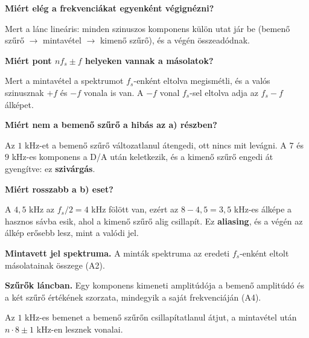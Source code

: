 \begin{elmelet}
\textbf{Miért elég a frekvenciákat egyenként végignézni?}\par Mert a lánc lineáris: minden szinuszos komponens külön utat jár be (bemenő szűrő $\to$ mintavétel $\to$ kimenő szűrő), és a végén összeadódnak.

\textbf{Miért pont $n f_s\pm f$ helyeken vannak a másolatok?}\par Mert a mintavétel a spektrumot $f_s$-enként eltolva megismétli, és a valós szinusznak $+f$ és $-f$ vonala is van. A $-f$ vonal $f_s$-sel eltolva adja az $f_s-f$ álképet.

\textbf{Miért nem a bemenő szűrő a hibás az a) részben?}\par Az $1$ kHz-et a bemenő szűrő változatlanul átengedi, ott nincs mit levágni. A $7$ és $9$ kHz-es komponens a D/A után keletkezik, és a kimenő szűrő engedi át gyengítve: ez \textbf{szivárgás}.

\textbf{Miért rosszabb a b) eset?}\par A $4{,}5$ kHz az $f_s/2=4$ kHz fölött van, ezért az $8-4{,}5=3{,}5$ kHz-es álképe a hasznos sávba esik, ahol a kimenő szűrő alig csillapít. Ez \textbf{aliasing}, és a végén az álkép erősebb lesz, mint a valódi jel.
\end{elmelet}
\begin{elmelet}
\textbf{Mintavett jel spektruma.} A minták spektruma az eredeti $f_s$-enként eltolt másolatainak összege (A2).
\begin{center}\end{center}


\textbf{Szűrők láncban.} Egy komponens kimeneti amplitúdója a bemenő amplitúdó és a két szűrő értékének szorzata, mindegyik a saját frekvenciáján (A4).
\end{elmelet}

Az $1$ kHz-es bemenet a bemenő szűrőn csillapítatlanul átjut, a mintavétel után $n\cdot 8\pm1$ kHz-en lesznek vonalai.

\begin{center}\end{center}

\begin{center}\end{center}

